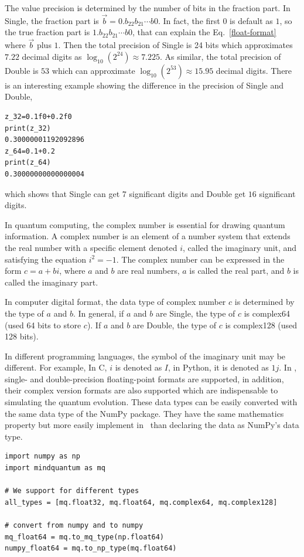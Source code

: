 The value precision is determined by the number of bits in the fraction part.
In Single, the fraction part is $\vec{b}=0.b_{22}b_{21}\cdots b{0}$.
In fact, the first $0$ is default as $1$, so the true fraction part is $1.b_{22}b_{21}\cdots b{0}$, that can explain the Eq.~\eqref{float-format} where $\vec{b}$ plus $1$.
Then the total precision of Single is 24 bits which approximates $7.22$ decimal digits as $\log_{10}(2^{24}) \approx 7.225$.
As similar, the total precision of Double is $53$ which can approximate $\log_{10}(2^{53}) \approx 15.95$ decimal digits.
There is an interesting example showing the difference in the precision of Single and Double,
\begin{lstlisting}
z_32=0.1f0+0.2f0
print(z_32)
0.30000001192092896
z_64=0.1+0.2
print(z_64)
0.30000000000000004
\end{lstlisting}
which shows that Single can get $7$ significant digits and Double get $16$ significant digits.


In quantum computing, the complex number is essential for drawing quantum information. A complex number is an element of a number system that extends the real number with a specific element denoted $i$, called the imaginary unit, and satisfying the equation $i^2=-1$.
The complex number can be expressed in the form $c=a+bi$, where $a$ and $b$ are real numbers, $a$ is called the real part, and $b$ is called the imaginary part.

In computer digital format, the data type of complex number $c$ is determined by the type of $a$ and $b$.
In general, if $a$ and $b$ are Single, the type of $c$ is complex64 (used 64 bits to store $c$). If $a$ and $b$ are Double, the type of $c$ is complex128 (used 128 bits).

In different programming languages, the symbol of the imaginary unit may be different.
For example, In C, $i$ is denoted as $I$, in Python, it is denoted as $1j$.
In \MindQuantum, single- and double-precision floating-point formats are supported, in addition, their complex version formats are also supported which are indispensable to simulating the quantum evolution.
These data types can be easily converted with the same data type of the NumPy \cite{harris2020array} package. They have the same mathematics property but more easily implement in \MindQuantum\ than declaring the data as NumPy's data type.

\begin{lstlisting}
import numpy as np
import mindquantum as mq

# We support for different types
all_types = [mq.float32, mq.float64, mq.complex64, mq.complex128]

# convert from numpy and to numpy
mq_float64 = mq.to_mq_type(np.float64)
numpy_float64 = mq.to_np_type(mq.float64)
\end{lstlisting}


